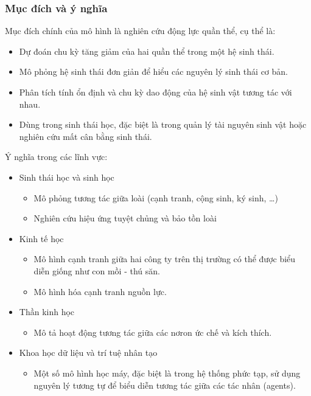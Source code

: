 \documentclass[a4paper,15pt]{article}
\begin{document}
\subsubsection{Mục đích và ý nghĩa}
Mục đích chính của mô hình là nghiên cứu động lực quần thể, cụ thể là:
\begin{itemize}
    \item Dự đoán chu kỳ tăng giảm của hai quần thể trong một hệ sinh thái.
    \item Mô phỏng hệ sinh thái đơn giản để hiểu các nguyên lý sinh thái cơ bản.
    \item Phân tích tính ổn định và chu kỳ dao động của hệ sinh vật tương tác với nhau.
    \item Dùng trong sinh thái học, đặc biệt là trong quản lý tài nguyên sinh vật hoặc nghiên cứu mất cân bằng sinh thái.
\end{itemize}
Ý nghĩa trong các lĩnh vực:
\begin{itemize}
    \item Sinh thái học và sinh học
    \begin{itemize}
        \item Mô phỏng tương tác giữa loài (cạnh tranh, cộng sinh, ký sinh, \ldots)
        \item Nghiên cứu hiệu ứng tuyệt chủng và bảo tồn loài
    \end{itemize}
    
    \item Kinh tế học
    \begin{itemize}
        \item Mô hình cạnh tranh giữa hai công ty trên thị trường có thể được biểu diễn giống như con mồi - thú săn.
        \item Mô hình hóa cạnh tranh nguồn lực.
    \end{itemize}
    
    \item Thần kinh học
    \begin{itemize}
        \item Mô tả hoạt động tương tác giữa các nơron ức chế và kích thích.
    \end{itemize}
    
    \item Khoa học dữ liệu và trí tuệ nhân tạo
    \begin{itemize}
        \item Một số mô hình học máy, đặc biệt là trong hệ thống phức tạp, sử dụng nguyên lý tương tự để biểu diễn tương tác giữa các tác nhân (agents).
    \end{itemize}
\end{itemize}
\end{document}
